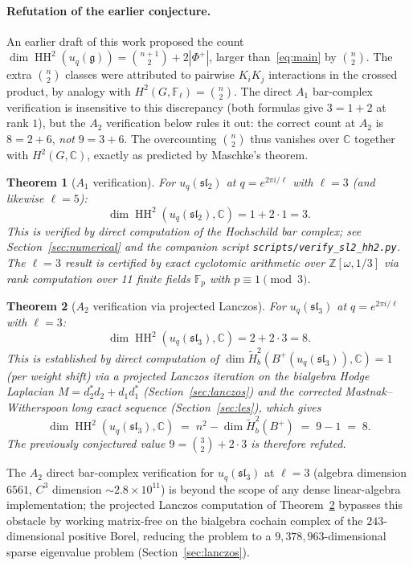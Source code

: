 \documentclass[11pt,letterpaper]{amsart}
\theoremstyle{plain}
\newtheorem{theorem}{Theorem}[section]
\theoremstyle{definition}
\theoremstyle{remark}
\newcommand{\HH}{\operatorname{HH}}
\newcommand{\CC}{\mathbb{C}}
\newcommand{\FF}{\mathbb{F}}
\begin{document}
\paragraph{Refutation of the earlier conjecture.}
An earlier draft of this work proposed the count $\dim \HH^2(u_q(\mathfrak{g})) = \binom{n+1}{2} + 2|\Phi^+|$, larger than~\eqref{eq:main} by $\binom{n}{2}$. The extra $\binom{n}{2}$ classes were attributed to pairwise $K_i K_j$ interactions in the crossed product, by analogy with $H^2(G, \FF_\ell) = \binom{n}{2}$. The direct $A_1$ bar-complex verification is insensitive to this discrepancy (both formulas give $3 = 1 + 2$ at rank $1$), but the $A_2$ verification below rules it out: the correct count at $A_2$ is $8 = 2 + 6$, \emph{not} $9 = 3 + 6$. The overcounting $\binom{n}{2}$ thus vanishes over $\CC$ together with $H^2(G, \CC)$, exactly as predicted by Maschke's theorem.

\begin{theorem}[$A_1$ verification]
\label{thm:sl2}
For $u_q(\mathfrak{sl}_2)$ at $q = e^{2\pi i/\ell}$ with $\ell = 3$ (and likewise $\ell = 5$):
\[
\dim \HH^2(u_q(\mathfrak{sl}_2), \CC) = 1 + 2 \cdot 1 = 3.
\]
This is verified by direct computation of the Hochschild bar complex; see Section~\ref{sec:numerical} and the companion script \texttt{scripts/verify\_sl2\_hh2.py}. The $\ell = 3$ result is certified by exact cyclotomic arithmetic over $\mathbb{Z}[\omega, 1/3]$ via rank computation over 11 finite fields $\mathbb{F}_p$ with $p \equiv 1 \pmod{3}$.
\end{theorem}

\begin{theorem}[$A_2$ verification via projected Lanczos]
\label{thm:sl3}
For $u_q(\mathfrak{sl}_3)$ at $q = e^{2\pi i/\ell}$ with $\ell = 3$:
\[
\dim \HH^2(u_q(\mathfrak{sl}_3), \CC) = 2 + 2 \cdot 3 = 8.
\]
This is established by direct computation of $\dim \tilde{H}^2_b(B^+(u_q(\mathfrak{sl}_3)), \CC) = 1$ (per weight shift) via a projected Lanczos iteration on the bialgebra Hodge Laplacian $M = d_2^* d_2 + d_1 d_1^*$ (Section~\ref{sec:lanczos}) and the corrected Mastnak--Witherspoon long exact sequence (Section~\ref{sec:les}), which gives
\[
\dim \HH^2(u_q(\mathfrak{sl}_3), \CC) \;=\; n^2 - \dim \tilde{H}^2_b(B^+) \;=\; 9 - 1 \;=\; 8.
\]
The previously conjectured value $9 = \binom{3}{2} + 2 \cdot 3$ is therefore \emph{refuted}.
\end{theorem}

The $A_2$ direct bar-complex verification for $u_q(\mathfrak{sl}_3)$ at $\ell = 3$ (algebra dimension $6561$, $C^3$ dimension $\sim 2.8 \times 10^{11}$) is beyond the scope of any dense linear-algebra implementation; the projected Lanczos computation of Theorem~\ref{thm:sl3} bypasses this obstacle by working matrix-free on the bialgebra cochain complex of the $243$-dimensional positive Borel, reducing the problem to a $9{,}378{,}963$-dimensional sparse eigenvalue problem (Section~\ref{sec:lanczos}).
\end{document}
